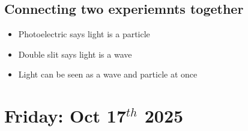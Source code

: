 \documentclass{article}
\begin{document}
\subsection{Connecting two experiemnts together}
\begin{itemize}
  \item Photoelectric says light is a particle
  \item Double slit says light is a wave
  \item Light can be seen as a wave and particle at once
\end{itemize}

\newpage
\section{Friday: Oct 17$^{th}$ 2025}
\end{document}
